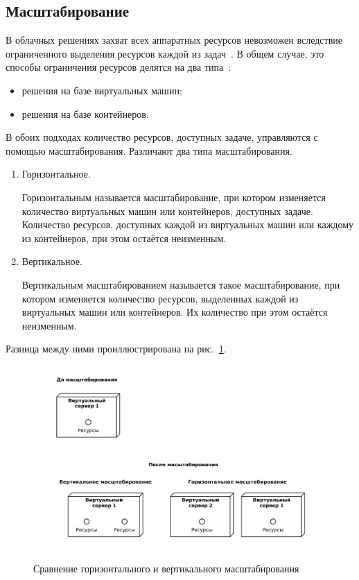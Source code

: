 \subsection{Масштабирование}
В облачных решениях захват всех аппаратных ресурсов невозможен вследствие ограниченного выделения ресурсов каждой из задач~\cite{fake-23}.
В общем случае, это способы ограничения ресурсов делятся на два типа~\cite{containers-and-vm-big-data}:
\begin{itemize}
    \item решения на базе виртуальных машин;
    \item решения на базе контейнеров.
\end{itemize}

В обоих подходах количество ресурсов, доступных задаче, управляются с помощью масштабирования. Различают два типа масштабирования.
\begin{enumerate}
    \item Горизонтальное.
    
    Горизонтальным называется масштабирование, при котором изменяется количество виртуальных машин или контейнеров, доступных задаче.
    Количество ресурсов, доступных каждой из виртуальных машин или каждому из контейнеров, при этом остаётся неизменным.
    \item Вертикальное.
    
    Вертикальным масштабированием называется такое масштабирование, при котором изменяется количество ресурсов, выделенных каждой из виртуальных машин или контейнеров.
    Их количество при этом остаётся неизменным.
\end{enumerate}
Разница между ними проиллюстрирована на рис.~\ref{scale-out-up}.

\begin{figure}[H]
    \centering
    \includegraphics[width=\textwidth]{img/scale-out-up.pdf}
    \caption{Сравнение горизонтального и вертикального масштабирования}
    \label{scale-out-up}
\end{figure}

